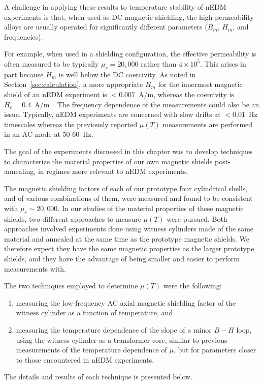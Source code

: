 A challenge in applying these results to temperature stability of nEDM
experiments is that, when used as DC magnetic shielding, the
high-permeability alloys are usually operated for significantly
different parameters ($B_m$, $H_m$, and frequencies).

For example, when used in a shielding configuration, the effective
permeability is often measured to be typically $\mu_r=20,000$ rather
than $4\times 10^5$.  This arises in part because $H_m$ is well below
the DC coercivity.  As noted in Section~\ref{sec:calculation}, a more
appropriate $H_m$ for the innermost magnetic shield of an nEDM
experiment is $<0.007$~A/m, whereas the coercivity is
$H_c=0.4$~A/m~\cite{kruppvdm}.  The frequency dependence of the
measurements could also be an issue.  Typically, nEDM experiments are
concerned with slow drifts at $<0.01$~Hz timescales whereas the
previously reported $\mu(T)$ measurements are performed in an AC mode
at 50-60~Hz.


The goal of the experiments discussed in this chapter was to develop
techniques to characterize the material properties of our own magnetic
shields post-annealing, in regimes more relevant to nEDM experiments.




The magnetic shielding factors of each of our prototype four
cylindrical shells, and of various combinations of them, were measured
and found to be consistent with $\mu_r\sim 20,000$.  In our studies of
the material properties of these magnetic shields, two different
approaches to measure $\mu(T)$ were pursued.  Both approaches involved
experiments done using witness cylinders made of the same material and
annealed at the same time as the prototype magnetic shields.  We
therefore expect they have the same magnetic properties as the larger
prototype shields, and they have the advantage of being smaller and
easier to perform measurements with.

The two techniques employed to determine $\mu(T)$ were the following:
\begin{enumerate}
\item measuring the low-frequency AC axial magnetic shielding factor
  of the witness cylinder as a function of temperature, and
\item measuring the temperature dependence of the slope of a minor $B-H$
  loop, using the witness cylinder as a transformer core, similar to
  previous measurements of the temperature dependence of $\mu$, but
  for parameters closer to those encountered in nEDM experiments.
\end{enumerate}
The details and results of each technique is presented below.

